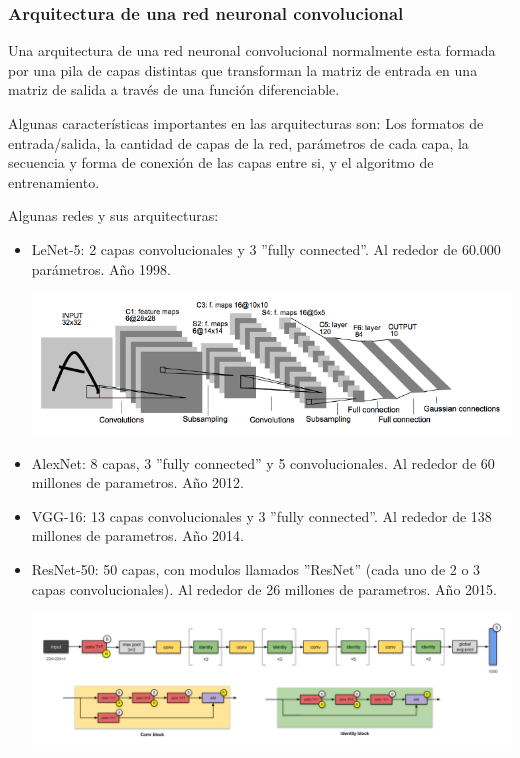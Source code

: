 \subsubsection{Arquitectura de una red neuronal convolucional}

Una arquitectura de una red neuronal convolucional normalmente esta formada por una pila de capas distintas que transforman la matriz de entrada en una matriz de salida a través de una función diferenciable.\par
Algunas características importantes en las arquitecturas son: Los formatos de entrada/salida, la cantidad de capas de la red, parámetros de cada capa, la secuencia y forma de conexión de las capas entre si, y el algoritmo de entrenamiento. \par

Algunas redes y sus arquitecturas:

\begin{itemize}
    \item LeNet-5: 2 capas convolucionales y 3 ''fully connected''. Al rededor de 60.000 parámetros. Año 1998.
    \begin{center}
        \includegraphics[scale=0.6]{Tesis/Capitulos/02_MARCO_TEORICO/img/LeNet5.png}
    \end{center}
    
    \item AlexNet: 8 capas, 3 ''fully connected'' y 5 convolucionales. Al rededor de 60 millones de parametros. Año 2012.
    
    \item VGG-16: 13 capas convolucionales y 3 ''fully connected''. Al rededor de 138 millones de parametros. Año 2014.
    
    \item ResNet-50: 50 capas, con modulos llamados ''ResNet'' (cada uno de 2 o 3 capas convolucionales). Al rededor de 26 millones de parametros. Año 2015.
    \begin{center}
        \includegraphics[scale=0.35]{Tesis/Capitulos/02_MARCO_TEORICO/img/ResNet50.png}
    \end{center}
\end{itemize}

